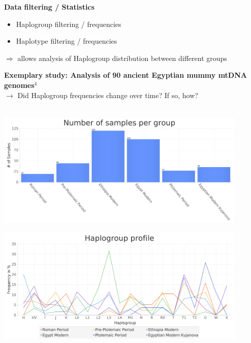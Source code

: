 \documentclass[a0paper,portrait]{baposter}
\begin{document}
\begin{poster}
{\begin{minipage}[t]{0.5\textwidth}
	\end{minipage}
	\hspace{0.5em}
	\begin{minipage}[t]{0.5\textwidth}
		\textbf{Data filtering / Statistics}
		\begin{itemize}[leftmargin=*]
			\item Haplogroup filtering / frequencies
			\item Haplotype filtering / frequencies
		\end{itemize}
	\end{minipage}
\begin{center}$\Rightarrow$ allows analysis of Haplogroup distribution between different groups\end{center}
	\vspace{1em}

\textbf{Exemplary study: Analysis of 90 ancient Egyptian mummy mtDNA genomes$^4$}\\\vspace{4mm}
$\rightarrow$ Did Haplogroup frequencies change over time? If so, how?\\
\\
	\begin{minipage}{0.5\textwidth}
		\includegraphics[width=0.9\textwidth]{figures/group_sizes2.png}
	\end{minipage}
	\begin{minipage}{0.5\textwidth}
			\includegraphics[width=0.9\textwidth]{figures/profile.png}
	\end{minipage}

}
\end{poster}
\end{document}
